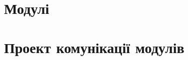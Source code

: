 \documentclass[14pt,a4paper]{extarticle}
\begin{document}
\clearpage


\clearpage
\section{Модулі}


\clearpage

\clearpage

\clearpage

\clearpage
\section{Проект комунікації модулів}
\end{document}
